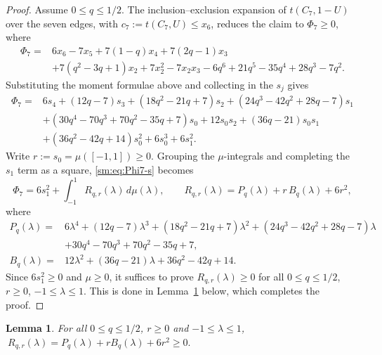\documentclass[11pt]{article}
\newtheorem{lemma}[theorem]{Lemma}
\theoremstyle{remark}
\theoremstyle{plain}
\theoremstyle{plain}
\begin{document}
\begin{proof}
Assume $0\le q\le1/2$.  The inclusion--exclusion expansion of
$t(C_7,1-U)$ over the seven edges, with $c_7:=t(C_7,U)\le x_6$, reduces the
claim to $\Phi_7\ge0$, where
\[
\begin{aligned}
   \Phi_7={}&6x_6-7x_5+7(1-q)x_4+7(2q-1)x_3\\
   &+7(q^{2}-3q+1)x_2+7x_2^{2}-7x_2x_3-6q^{6}+21q^{5}-35q^{4}+28q^{3}-7q^{2}.
\end{aligned}
\]
Substituting the moment formulae above and collecting in the $s_j$ gives
\begin{equation}\label{sm:eq:Phi7-s}
\begin{aligned}
   \Phi_7={}&6s_4+(12q-7)s_3+(18q^{2}-21q+7)s_2
             +(24q^{3}-42q^{2}+28q-7)s_1\\
   &+(30q^{4}-70q^{3}+70q^{2}-35q+7)s_0
     +12s_0s_2+(36q-21)s_0s_1\\
   &+(36q^{2}-42q+14)s_0^{2}+6s_0^{3}+6s_1^{2}.
\end{aligned}
\end{equation}
Write $r:=s_0=\mu([-1,1])\ge0$.  Grouping the $\mu$-integrals and completing
the $s_1$ term as a square, \eqref{sm:eq:Phi7-s} becomes
\begin{equation}\label{sm:eq:Phi7-int}
   \Phi_7=6s_1^{2}+\int_{-1}^{1}R_{q,r}(\lambda)\,d\mu(\lambda),
   \qquad
   R_{q,r}(\lambda)=P_q(\lambda)+r\,B_q(\lambda)+6r^{2},
\end{equation}
where
\[
\begin{aligned}
   P_q(\lambda)={}&6\lambda^{4}+(12q-7)\lambda^{3}+(18q^{2}-21q+7)\lambda^{2}
                    +(24q^{3}-42q^{2}+28q-7)\lambda\\
   &+30q^{4}-70q^{3}+70q^{2}-35q+7,\\
   B_q(\lambda)={}&12\lambda^{2}+(36q-21)\lambda+36q^{2}-42q+14 .
\end{aligned}
\]
Since $6s_1^{2}\ge0$ and $\mu\ge0$, it suffices to prove
$R_{q,r}(\lambda)\ge0$ for all $0\le q\le1/2$, $r\ge0$, $-1\le\lambda\le1$.
This is done in Lemma~\ref{sm:lem:C7-pos} below, which completes the proof.
\end{proof}

\begin{lemma}\label{sm:lem:C7-pos}
For all $0\le q\le1/2$, $r\ge0$ and $-1\le\lambda\le1$,
$\ R_{q,r}(\lambda)=P_q(\lambda)+rB_q(\lambda)+6r^{2}\ge0.$
\end{lemma}
\end{document}
